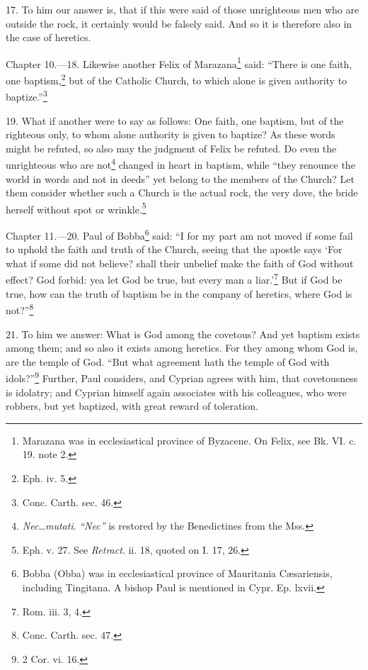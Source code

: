 17. To him our answer is, that if this were said of those unrighteous men who are outside the rock, it certainly would be falsely said. And so it is therefore also in the case of heretics.


Chapter 10.—18. Likewise another Felix of Marazana\footnote{\par  Marazana was in ecclesiastical province of Byzacene. On Felix, see Bk. VI. c. 19. note 2.} said: ``There is one faith, one baptism,\footnote{\par  Eph. iv. 5.} but of the Catholic Church, to which alone is given authority to baptize.''\footnote{\par  Conc. Carth. sec. 46.}

19. What if another were to say as follows: One faith, one baptism, but of the righteous only, to whom alone authority is given to baptize? As these words might be refuted, so also may the judgment of Felix be refuted. Do even the unrighteous who are not\footnote{\par  \emph{Nec…mutati}.\emph{ ``Nec''} is restored by the Benedictines from the  Mss.} changed in heart in baptism, while ``they renounce the world in words and not in deeds'' yet belong to the members of the Church? Let them consider whether such a Church is the actual rock, the very dove, the bride herself without spot or wrinkle.\footnote{\par  Eph. v. 27. See \emph{ Retract}. ii. 18, quoted on I. 17, 26.}


Chapter 11.—20. Paul of Bobba\footnote{\par  Bobba (Obba) was in ecclesiastical province of Mauritania Cæsariensis, including Tingitana. A bishop Paul is mentioned in Cypr. Ep. lxvii.} said: ``I for my part am not moved if some fail to uphold the faith and truth of the Church, seeing that the apostle says ‘For what if some did not believe? shall their unbelief make the faith of God without effect? God forbid: yea let God be true, but every man a liar.’\footnote{\par  Rom. iii. 3, 4.} But if God be true, how can the truth of baptism be in the company of heretics, where God is not?''\footnote{\par  Conc. Carth. sec. 47.}

21. To him we answer: What is God among the covetous? And yet baptism exists among them; and so also it exists among heretics. For they among whom God is, are the temple of God. ``But what agreement hath the temple of God with idols?''\footnote{\par  2 Cor. vi. 16.} Further, Paul considers, and Cyprian agrees with him, that covetousness is idolatry; and Cyprian himself again associates with his colleagues, who were robbers, but yet baptized, with great reward of toleration.

